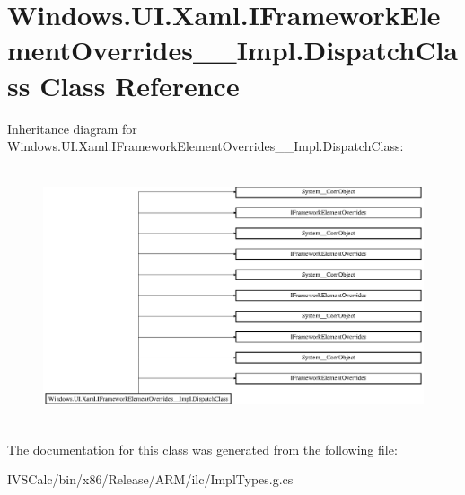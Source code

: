 \hypertarget{class_windows_1_1_u_i_1_1_xaml_1_1_i_framework_element_overrides_____impl_1_1_dispatch_class}{}\section{Windows.\+U\+I.\+Xaml.\+I\+Framework\+Element\+Overrides\+\_\+\+\_\+\+Impl.\+Dispatch\+Class Class Reference}
\label{class_windows_1_1_u_i_1_1_xaml_1_1_i_framework_element_overrides_____impl_1_1_dispatch_class}
Inheritance diagram for Windows.\+U\+I.\+Xaml.\+I\+Framework\+Element\+Overrides\+\_\+\+\_\+\+Impl.\+Dispatch\+Class\+:\begin{figure}[H]
\begin{center}
\leavevmode
\includegraphics[height=7.549020cm]{class_windows_1_1_u_i_1_1_xaml_1_1_i_framework_element_overrides_____impl_1_1_dispatch_class}
\end{center}
\end{figure}


The documentation for this class was generated from the following file\+:\begin{DoxyCompactItemize}
\item 
I\+V\+S\+Calc/bin/x86/\+Release/\+A\+R\+M/ilc/Impl\+Types.\+g.\+cs\end{DoxyCompactItemize}
